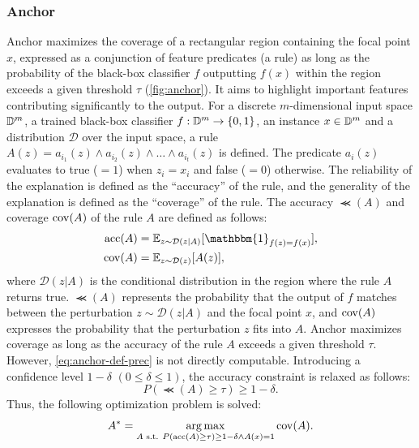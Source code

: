 \documentclass[runningheads]{llncs}
\begin{document}
{\subsubsection[Anchor]{Anchor~\cite{ribeiro2018anchors}}
Anchor maximizes the coverage of a rectangular region
containing the focal point $x$,
expressed as a conjunction of feature predicates (a rule)
as long as the probability of the black-box classifier $f$
outputting $f(x)$ within the region exceeds a given threshold $\tau$
(\cref{fig:anchor}).
It aims to highlight important features
contributing significantly to the output.
For a discrete $m$-dimensional input space $\mathbb{D}^{m}$,
a trained black-box classifier $f: \mathbb{D}^{m} \to \{0,1\}$,
an instance $x \in \mathbb{D}^{m}$
and a distribution $\mathcal{D}$ over the input space,
a rule $A(z) = a_{i_1}(z) \wedge a_{i_2}(z) \wedge \dots \wedge a_{i_t}(z)$ is defined.
The predicate $a_i(z)$ evaluates to true ($=1$) when $z_i = x_i$ and false ($=0$) otherwise.
The reliability of the explanation is defined as the ``accuracy'' of the rule,
and the generality of the explanation is defined as the ``coverage'' of the rule.
The accuracy $\Prec(A)$ and coverage $\operatorname{cov}(A)$ of the rule $A$ are defined as follows:
\begin{align}
  \Prec(A) & =\mathbb{E}_{z\sim\mathcal{D}(z|A)}
  [\mathbbm{1}_{f(z)=f(x)}], \label{eq:anchor-def-prec} \\
  \Cov(A)  & =\mathbb{E}_{z\sim\mathcal{D}(z)}[A(z)],
\end{align}
where $\mathcal{D}(z|A)$ is the conditional distribution in the region
where the rule $A$ returns true.
$\Prec(A)$ represents the probability that the output of $f$ matches
between the perturbation $z\sim\mathcal{D}(z|A)$ and the focal point $x$,
and $\operatorname{cov}(A)$ expresses the probability that the perturbation $z$ fits into $A$.
Anchor maximizes coverage as long as
the accuracy of the rule $A$ exceeds a given threshold $\tau$.
However, \cref{eq:anchor-def-prec} is not directly computable.
Introducing a confidence level $1-\delta$ $(0\le\delta\le1)$,
the accuracy constraint is relaxed as follows:
\begin{equation}
  \label{eq:const-prec}
  P(\Prec(A)\ge\tau)\ge1-\delta.
\end{equation}
Thus, the following optimization problem is solved:
\begin{equation}
  \label{eq:main-problem}
  A^*=\underset{A \text{~s.t. } P(\operatorname{acc}(A)\ge\tau)\ge1-\delta\wedge A(x)=1}
  {\arg\max}\operatorname{cov}(A).
\end{equation}

}
\end{document}
